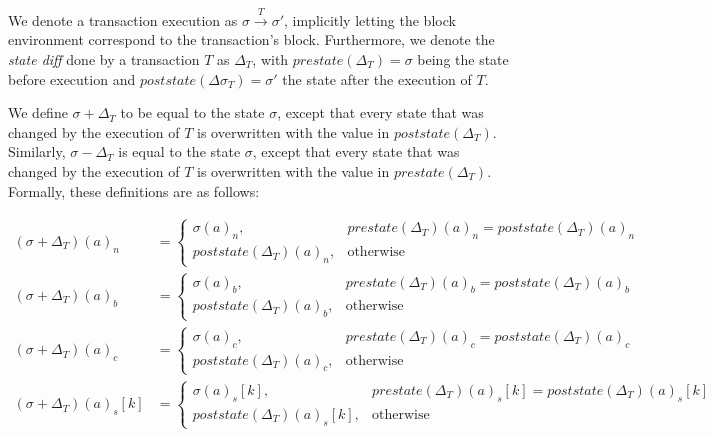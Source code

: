 \documentclass[draft,final]{vutinfth} %
\begin{document}
We denote a transaction execution as $\sigma \xrightarrow{T} \sigma\prime$, implicitly letting the block environment correspond to the transaction's block. Furthermore, we denote the \emph{state diff} done by a transaction $T$ as $\Delta_T$, with $prestate(\Delta_T) = \sigma$ being the state before execution and $poststate(\Delta\sigma_T) = \sigma\prime$ the state after the execution of $T$.

We define $\sigma + \Delta_T$ to be equal to the state $\sigma$, except that every state that was changed by the execution of $T$ is overwritten with the value in $poststate(\Delta_T)$. Similarly, $\sigma - \Delta_T$ is equal to the state $\sigma$, except that every state that was changed by the execution of $T$ is overwritten with the value in $prestate(\Delta_T)$. Formally, these definitions are as follows:

\begin{align*}
    (\sigma + \Delta_T)(a)_n    & =
    \begin{cases}
        \sigma(a)_n,              & prestate(\Delta_T)(a)_n = poststate(\Delta_T)(a)_n \\
        poststate(\Delta_T)(a)_n, & \text{otherwise}
    \end{cases}          \\
    (\sigma + \Delta_T)(a)_b    & =
    \begin{cases}
        \sigma(a)_b,              & prestate(\Delta_T)(a)_b = poststate(\Delta_T)(a)_b \\
        poststate(\Delta_T)(a)_b, & \text{otherwise}
    \end{cases}          \\
    (\sigma + \Delta_T)(a)_c    & =
    \begin{cases}
        \sigma(a)_c,              & prestate(\Delta_T)(a)_c = poststate(\Delta_T)(a)_c \\
        poststate(\Delta_T)(a)_c, & \text{otherwise}
    \end{cases}          \\
    (\sigma + \Delta_T)(a)_s[k] & =
    \begin{cases}
        \sigma(a)_s[k],              & prestate(\Delta_T)(a)_s[k] = poststate(\Delta_T)(a)_s[k] \\
        poststate(\Delta_T)(a)_s[k], & \text{otherwise}
    \end{cases} \\
\end{align*}
\end{document}

